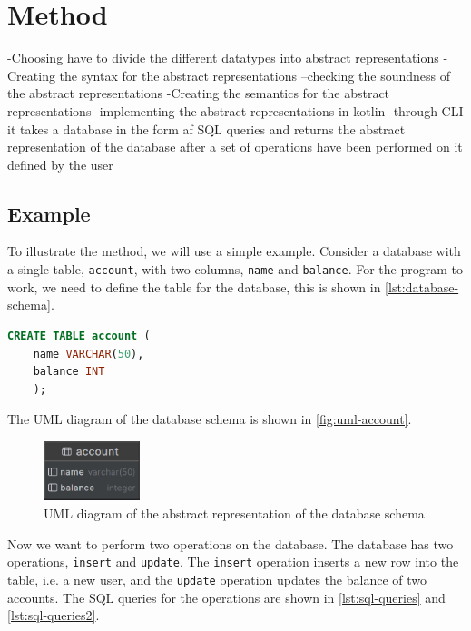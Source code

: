 \section{Method}
\label{sec:method}
-Choosing have to divide the different datatypes into abstract representations
-Creating the syntax for the abstract representations
--checking the soundness of the abstract representations
-Creating the semantics for the abstract representations
-implementing the abstract representations in kotlin
-through CLI it takes a database in the form af SQL queries and returns the abstract representation of the database after a set of operations have been performed on it defined by the user


\subsection{Example}\label{subsec:example}
To illustrate the method, we will use a simple example.
Consider a database with a single table, \texttt{account}, with two columns, \texttt{name} and \texttt{balance}.
For the program to work, we need to define the table for the database, this is shown in \autoref{lst:database-schema}.

\begin{lstlisting}[language=SQL,label={lst:database-schema}]
    CREATE TABLE account (
    name VARCHAR(50),
    balance INT
    );
\end{lstlisting}
The UML diagram of the database schema is shown in \autoref{fig:uml-account}.

\begin{figure}[htb!]
    \centering
    \includegraphics[width=0.25\textwidth]{figures/account.png}
    \caption{UML diagram of the abstract representation of the database schema}
    \label{fig:uml-account}
\end{figure}

Now we want to perform two operations on the database.
The database has two operations, \texttt{insert} and \texttt{update}.
The \texttt{insert} operation inserts a new row into the table, i.e. a new user, and the \texttt{update} operation updates the balance of two accounts.
The SQL queries for the operations are shown in \autoref{lst:sql-queries} and \autoref{lst:sql-queries2}.

